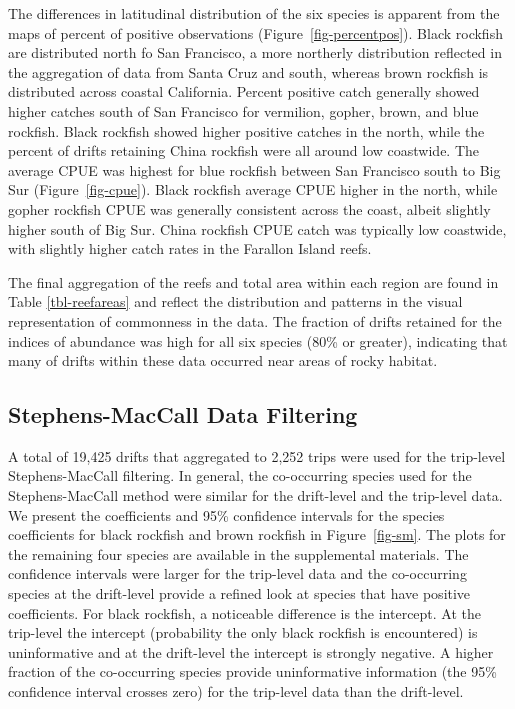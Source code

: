 \documentclass[
  12pt,
  authoryear,
  preprint,
  3p]{elsarticle}
\begin{document}
The differences in latitudinal distribution of the six species is
apparent from the maps of percent of positive observations
(Figure~\ref{fig-percentpos}). Black rockfish are distributed north fo
San Francisco, a more northerly distribution reflected in the
aggregation of data from Santa Cruz and south, whereas brown rockfish is
distributed across coastal California. Percent positive catch generally
showed higher catches south of San Francisco for vermilion, gopher,
brown, and blue rockfish. Black rockfish showed higher positive catches
in the north, while the percent of drifts retaining China rockfish were
all around low coastwide. The average CPUE was highest for blue rockfish
between San Francisco south to Big Sur (Figure~\ref{fig-cpue}). Black
rockfish average CPUE higher in the north, while gopher rockfish CPUE
was generally consistent across the coast, albeit slightly higher south
of Big Sur. China rockfish CPUE catch was typically low coastwide, with
slightly higher catch rates in the Farallon Island reefs.

The final aggregation of the reefs and total area within each region are
found in Table \ref{tbl-reefareas} and reflect the distribution and
patterns in the visual representation of commonness in the data. The
fraction of drifts retained for the indices of abundance was high for
all six species (80\% or greater), indicating that many of drifts within
these data occurred near areas of rocky habitat.

\hypertarget{stephens-maccall-data-filtering-1}{%
\subsection{Stephens-MacCall Data
Filtering}\label{stephens-maccall-data-filtering-1}}

A total of 19,425 drifts that aggregated to 2,252 trips were used for
the trip-level Stephens-MacCall filtering. In general, the co-occurring
species used for the Stephens-MacCall method were similar for the
drift-level and the trip-level data. We present the coefficients and
95\% confidence intervals for the species coefficients for black
rockfish and brown rockfish in Figure~\ref{fig-sm}. The plots for the
remaining four species are available in the supplemental materials. The
confidence intervals were larger for the trip-level data and the
co-occurring species at the drift-level provide a refined look at
species that have positive coefficients. For black rockfish, a
noticeable difference is the intercept. At the trip-level the intercept
(probability the only black rockfish is encountered) is uninformative
and at the drift-level the intercept is strongly negative. A higher
fraction of the co-occurring species provide uninformative information
(the 95\% confidence interval crosses zero) for the trip-level data than
the drift-level.
\end{document}
